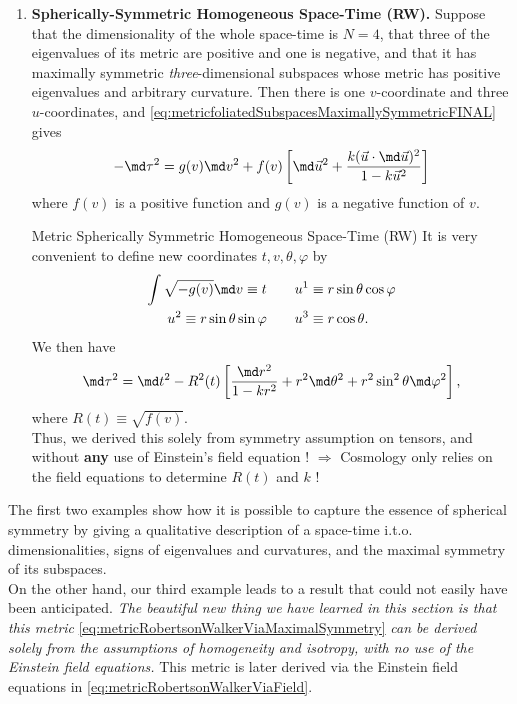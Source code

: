 \begin{enumerate}
\item \textbf{Spherically-Symmetric Homogeneous Space-Time (RW).} Suppose that the dimensionality of the whole space-time is $N=4$, that three of the eigenvalues of its metric are positive and one is negative, and that it has maximally symmetric \emph{three}-dimensional subspaces whose metric has positive eigenvalues and arbitrary curvature. Then there is one $v$-coordinate and three $u$-coordinates, and \ref{eq:metricfoliatedSubspacesMaximallySymmetricFINAL} gives
\begin{equation*}
	-\md \tau^2 = g(v) \md v^2 + f(v) \left[\md \vec{u}^2+\frac{k(\vec{u}\cdot \md \vec{u})^2 }{1-k \vec{u}^2}\right]
\end{equation*}
where $f(v)$ is a positive function and $g(v)$ is a negative function of $v$.
\begin{mybox}{Metric Spherically Symmetric Homogeneous Space-Time (RW)}
It is very convenient to define new coordinates $t,v, \theta,\varphi$ by
\begin{align*}
	\int \sqrt{-g(v)} \md v \equiv t \qquad u^1 &\equiv r \sin\theta \cos \varphi \\
	u^2\equiv r \sin\theta \sin\varphi \qquad u^3 &\equiv r \cos \theta.
\end{align*}
We then have
\begin{equation}
	\label{eq:metricRobertsonWalkerViaMaximalSymmetry}
	\md \tau^2 = \md t^2 - R^2(t) \left[\frac{\md r^2}{1-k r^2} + r^2\md\theta^2 + r^2\sin^2 \theta \md \varphi^2\right],
\end{equation}
where $R(t)\equiv \sqrt{f(v)}$.\\
Thus, we derived this solely from symmetry assumption on tensors, and without \textbf{any} use of Einstein's field equation ! $\Rightarrow$ Cosmology only relies on the field equations to determine $R(t)$ and $k$ !
\end{mybox}
\end{enumerate}
The first two examples show how it is possible to capture the essence of spherical symmetry by giving a qualitative description of a space-time i.t.o. dimensionalities, signs of eigenvalues and curvatures, and the maximal symmetry of its subspaces. \\
On the other hand, our third example leads to a result that could not easily have been anticipated. \emph{The beautiful new thing we have learned in this section is that this metric} \ref{eq:metricRobertsonWalkerViaMaximalSymmetry} \emph{can be derived solely from the assumptions of homogeneity and isotropy, with no use of the Einstein field equations.} This metric is later derived via the Einstein field equations in \ref{eq:metricRobertsonWalkerViaField}.


